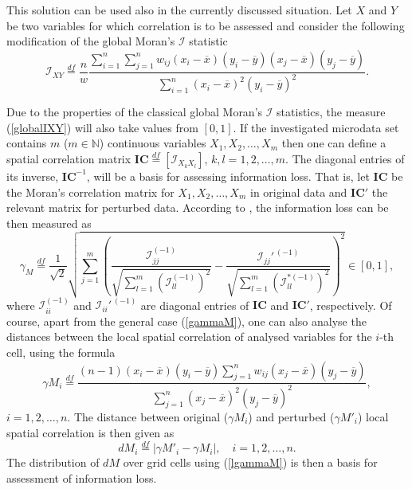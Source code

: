 This solution can be used also in the currently discussed situation. Let $X$ and $Y$ be two variables for which correlation is to be assessed and consider the following modification of the global  Moran's $\mathcal{I}$ statistic
\begin{equation}
 \mathcal{I}_{XY}\stackrel{df}{=}\frac{n}{w}\frac{\sum_{i=1}^n{\sum_{j=1}^n{w_{ij}(x_i-\overline{x})(y_i-\overline{y})(x_j-\overline{x})(y_j-\overline{y})}}}{\sum_{i=1}^n{(x_i-\overline{x})^2(y_i-\overline{y})^2}}.
\label{globalIXY}
\end{equation}

Due to the properties of the classical global Moran's $\mathcal{I}$ statistics, the measure (\ref{globalIXY}) will also take values from $[0,1]$. If the investigated microdata set contains $m$ ($m\in\mathbb{N}$) continuous variables $X_1,X_2,\ldots,X_m$ then one can define a spatial correlation matrix $\mathbf{IC}\stackrel{df}{=}[\mathcal{I}_{X_kX_l}]$, $k,l=1,2,\ldots,m$. The diagonal entries of its inverse, $\mathbf{IC}^{-1}$, will be a basis for assessing information loss. That is, let $\mathbf{IC}$ be the Moran's correlation matrix for $X_1,X_2,\ldots,X_m$ in original data and $\mathbf{IC}'$ the relevant matrix for perturbed data. According to \cite{Mlodak2022}, the information loss can be then measured as
\begin{equation}
 \gamma_M\stackrel{df}{=}\frac{1}{\sqrt{2}}\sqrt{\sum_{j=1}^{m}{\left(\frac{\mathcal{I}_{jj}^{(-1)}}{\sqrt{\sum_{l=1}^m{\left(\mathcal{I}_{ll}^{(-1)}\right)^2}}}-\frac{\mathcal{I}_{jj}'^{\,(-1)}}{\sqrt{\sum_{l=1}^m{\left(\mathcal{I}_{ll}^{*(-1)}\right)^2}}}\right)^2}}\in [0,1],
\label{gammaM}
\end{equation}
where $\mathcal{I}_{ii}^{(-1)}$ and $\mathcal{I}_{ii}'^{\,(-1)}$ are diagonal entries of $\mathbf{IC}$ and $\mathbf{IC}'$, respectively. Of course, apart from the general case (\ref{gammaM}), one can also analyse the distances between the local spatial correlation of analysed variables for the $i$-th cell, using the formula
\begin{equation}
 {\gamma}M_i\stackrel{df}{=}\frac{(n-1)(x_i-\overline{x})(y_i-\overline{y})\sum_{j=1}^n{w_{ij}(x_j-\overline{x})(y_j-\overline{y})}}{\sum_{j=1}^n{(x_j-\overline{x})^2(y_j-\overline{y})^2}},
\label{lgammaM}
\end{equation}
$i=1,2,\ldots,n$. The distance between original (${\gamma}M_i$) and perturbed (${\gamma}M'_i$) local spatial correlation is then given as
\begin{equation}
dM_i\stackrel{df}{=}\left|{\gamma}M'_i-{\gamma}M_i\right|,\quad i=1,2,\ldots,n.
\label{eq:dM_i}
\end{equation}
The distribution of $dM$ over grid cells using (\ref{lgammaM}) is then a basis for assessment of information loss.  


